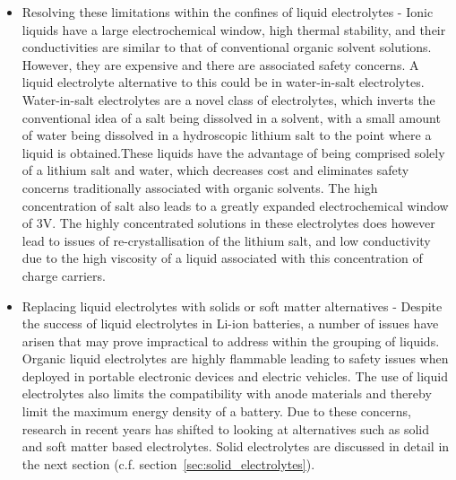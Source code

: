 \documentclass[../main.tex]{subfiles}
\begin{document}
\begin{itemize}
    \item Resolving these limitations within the confines of liquid electrolytes - Ionic liquids have a large electrochemical window, high thermal stability, and their conductivities are similar to that of conventional organic solvent solutions.\cite{macfarlane2014energy} However, they are expensive and there are associated safety concerns.\cite{ralisch2005energetic, smiglak2006combustible} A liquid electrolyte alternative to this could be in water-in-salt electrolytes. Water-in-salt electrolytes are a novel class of electrolytes, which inverts the conventional idea of a salt being dissolved in a solvent, with a small amount of water being dissolved in a hydroscopic lithium salt to the point where a liquid is obtained.\cite{suo2015water,chen2020water}These liquids have the advantage of being comprised solely of a lithium salt and water, which decreases cost and eliminates safety concerns traditionally associated with organic solvents. The high concentration of salt also leads to a greatly expanded electrochemical window of 3V\cite{suo2016advanced}. The highly concentrated solutions in these electrolytes does however lead to issues of re-crystallisation of the lithium salt, and low conductivity due to the high viscosity of a liquid associated with this concentration of charge carriers\cite{chen2020water,li_transport_2019}.
    

    \item Replacing liquid electrolytes with solids or soft matter alternatives - Despite the success of liquid electrolytes in Li-ion batteries, a number of issues have arisen that may prove impractical to address within the grouping of liquids. Organic liquid electrolytes are highly flammable leading to safety issues when deployed in portable electronic devices and electric vehicles. The use of liquid electrolytes also limits the compatibility with anode materials and thereby limit the maximum energy density of a battery. Due to these concerns, research in recent years has shifted to looking at alternatives such as solid and soft matter based electrolytes. Solid electrolytes are discussed in detail in the next section (c.f. section~\ref{sec:solid_electrolytes}).
\end{itemize}
    
\end{document}
